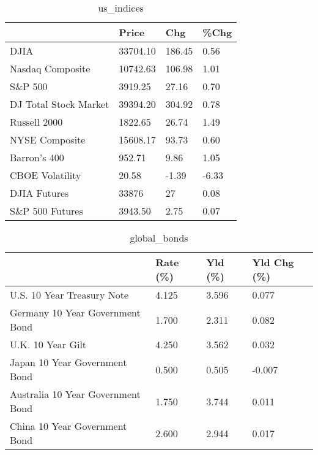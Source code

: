 \documentclass{article}%
\begin{document}
%


\begin{table}[htbp]%
\caption{us\_indices}%
\centering%
\begin{adjustbox}{width=1\textwidth}%
\begin{tabular}{llll}
\toprule
                      &    Price &    Chg &  \%Chg \\
\midrule
                 DJIA & 33704.10 & 186.45 &  0.56 \\
     Nasdaq Composite & 10742.63 & 106.98 &  1.01 \\
              S\&P 500 &  3919.25 &  27.16 &  0.70 \\
DJ Total Stock Market & 39394.20 & 304.92 &  0.78 \\
         Russell 2000 &  1822.65 &  26.74 &  1.49 \\
       NYSE Composite & 15608.17 &  93.73 &  0.60 \\
         Barron's 400 &   952.71 &   9.86 &  1.05 \\
      CBOE Volatility &    20.58 &  -1.39 & -6.33 \\
         DJIA Futures &    33876 &     27 &  0.08 \\
      S\&P 500 Futures &  3943.50 &   2.75 &  0.07 \\
\bottomrule
\end{tabular}
%
\end{adjustbox}%
\end{table}

%


\begin{table}[htbp]%
\caption{global\_bonds}%
\centering%
\begin{adjustbox}{width=1\textwidth}%
\begin{tabular}{llll}
\toprule
                                  & Rate (\%) & Yld (\%) & Yld Chg (\%) \\
\midrule
       U.S. 10 Year Treasury Note &    4.125 &   3.596 &       0.077 \\
  Germany 10 Year Government Bond &    1.700 &   2.311 &       0.082 \\
                U.K. 10 Year Gilt &    4.250 &   3.562 &       0.032 \\
    Japan 10 Year Government Bond &    0.500 &   0.505 &      -0.007 \\
Australia 10 Year Government Bond &    1.750 &   3.744 &       0.011 \\
    China 10 Year Government Bond &    2.600 &   2.944 &       0.017 \\
\bottomrule
\end{tabular}
%
\end{adjustbox}%
\end{table}
\end{document}
